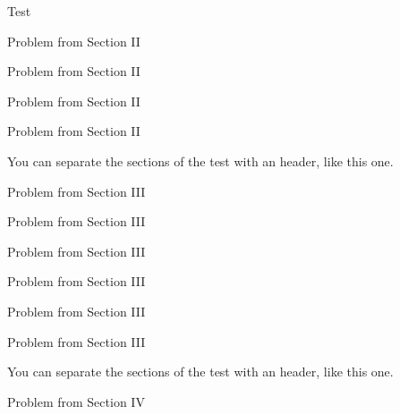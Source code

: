 \documentclass{article}
\begin{document}
\begin{exam}{Test\nExam}
\begin{problem}[5]
Problem from Section II
\end{problem}

\begin{problem}[5]
Problem from Section II
\end{problem}

\begin{problem}[5]
Problem from Section II
\end{problem}

\begin{problem}[5]
Problem from Section II
\end{problem}


\begin{eqComments}
You can separate the sections of the test with an header, like this one.
\end{eqComments}

\begin{problem}[5]
Problem from Section III
\end{problem}

\begin{problem}[5]
Problem from Section III
\end{problem}

\begin{problem}[5]
Problem from Section III
\end{problem}

\begin{problem}[5]
Problem from Section III
\end{problem}

\begin{problem}[5]
Problem from Section III
\end{problem}

\begin{problem}[5]
Problem from Section III
\end{problem}


\promoteNewPage

\begin{eqComments}[Section IV.]
You can separate the sections of the test with an header, like this one.
\end{eqComments}
\begin{problem}[5]
Problem from Section IV
\end{problem}


\end{exam}
\end{document}
